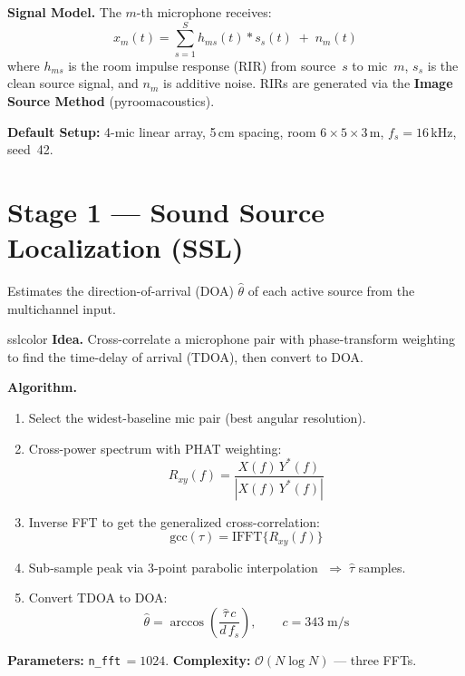 \documentclass[11pt,a4paper]{article}
\begin{document}
\noindent\textbf{Signal Model.}\quad
The $m$-th microphone receives:
\begin{equation}
x_m(t) = \sum_{s=1}^{S} h_{ms}(t) * s_s(t) \;+\; n_m(t)
\label{eq:signal}
\end{equation}
where $h_{ms}$ is the room impulse response (RIR) from source~$s$ to mic~$m$, $s_s$ is the clean source signal, and $n_m$ is additive noise.
RIRs are generated via the \textbf{Image Source Method} (pyroomacoustics).

\medskip
\noindent\textbf{Default Setup:} 4-mic linear array, 5\,cm spacing, room $6\!\times\!5\!\times\!3$\,m, $f_s = 16$\,kHz, seed~42.

\section{Stage 1 --- Sound Source Localization (SSL)}

Estimates the direction-of-arrival (DOA) $\hat{\theta}$ of each active source from the multichannel input.

\begin{modulebox}{sslcolor}
\textbf{Idea.} Cross-correlate a microphone pair with phase-transform weighting to find the time-delay of arrival (TDOA), then convert to DOA.

\medskip\noindent
\textbf{Algorithm.}
\begin{enumerate}[nosep]
\item Select the widest-baseline mic pair (best angular resolution).
\item Cross-power spectrum with PHAT weighting:
\begin{equation}
R_{xy}(f) = \frac{X(f)\,Y^*(f)}{|X(f)\,Y^*(f)|}
\end{equation}
\item Inverse FFT to get the generalized cross-correlation:
\begin{equation}
\text{gcc}(\tau) = \text{IFFT}\{R_{xy}(f)\}
\end{equation}
\item Sub-sample peak via 3-point parabolic interpolation $\;\Rightarrow\;\hat{\tau}$ samples.
\item Convert TDOA to DOA:
\begin{equation}
\hat{\theta} = \arccos\!\left(\frac{\hat{\tau}\,c}{d\,f_s}\right), \qquad c = 343\;\text{m/s}
\end{equation}
\end{enumerate}

\noindent\textbf{Parameters:} \texttt{n\_fft}$\,=1024$.\quad
\textbf{Complexity:} $\mathcal{O}(N\log N)$ --- three FFTs.
\end{modulebox}
\end{document}

